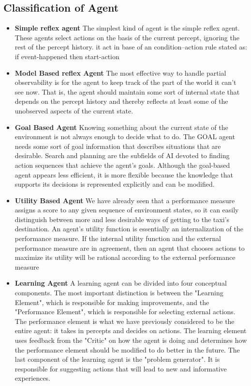\subsection{Classification of Agent}
\begin{itemize}
  \item \textbf{Simple reflex agent}
    The simplest kind of agent is the simple reflex agent. These agents select actions on the basis of the current percept, ignoring the rest of the percept history.
    it act in base of an condition–action rule stated as:
    if event-happened then start-action
  \item \textbf{Model Based reflex Agent}
  The most effective way to handle partial observability is for the agent to keep track of the part of the world it can’t see now.
  That is, the agent should maintain some sort of internal state that depends on the percept history and thereby reflects at least some of the unobserved aspects of the current state.
  \item \textbf{Goal Based Agent}
  Knowing something about the current state of the environment is not always enough to decide what to do. The GOAL agent needs some sort of goal information that describes situations that are desirable.
  Search and planning are the subfields of AI devoted to finding action sequences that achieve the agent’s goals.
  Although the goal-based agent appears less efficient, it is more flexible because the knowledge that supports its decisions is represented explicitly and can be modified.
  \item \textbf{Utility Based Agent} We have already seen that a performance measure assigns a score to any given sequence of environment states, so it can easily distinguish between more and less desirable ways of getting to the taxi’s destination. An agent’s utility function is essentially an internalization
  of the performance measure. If the internal utility function and the external performance measure are in agreement, then an agent that chooses actions to maximize its utility will be
  rational according to the external performance measure

  \item \textbf{Learning Agent}
  A learning agent can be divided into four conceptual components.
  The most important distinction is between the "Learning Element", which is responsible for making improvements, and the "Performance Element", which is responsible for selecting external actions. The performance element is what we have previously considered
  to be the entire agent: it takes in percepts and decides on actions. The learning element uses feedback from the "Critic" on how the agent is doing and determines how the performance element should be modified to do better in the future.
  The last component of the learning agent is the "problem generator". It is responsible for suggesting actions that will lead to new and informative experiences.
\end{itemize}

